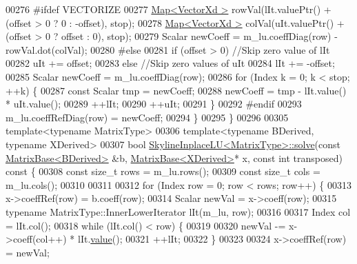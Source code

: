 \begin{DoxyCode}
00276 \textcolor{preprocessor}{#ifdef VECTORIZE}
00277         \hyperlink{group___core___module_class_eigen_1_1_map}{Map<VectorXd >} rowVal(lIt.valuePtr() + (offset > 0 ? 0 : -offset), stop);
00278         \hyperlink{group___core___module_class_eigen_1_1_map}{Map<VectorXd >} colVal(uIt.valuePtr() + (offset > 0 ? offset : 0), stop);
00279         Scalar newCoeff = m\_lu.coeffDiag(row) - rowVal.dot(colVal);
00280 \textcolor{preprocessor}{#else}
00281         \textcolor{keywordflow}{if} (offset > 0) \textcolor{comment}{//Skip zero value of lIt}
00282             uIt += offset;
00283         \textcolor{keywordflow}{else} \textcolor{comment}{//Skip zero values of uIt}
00284             lIt += -offset;
00285         Scalar newCoeff = m\_lu.coeffDiag(row);
00286         \textcolor{keywordflow}{for} (Index k = 0; k < stop; ++k) \{
00287             \textcolor{keyword}{const} Scalar tmp = newCoeff;
00288             newCoeff = tmp - lIt.value() * uIt.value();
00289             ++lIt;
00290             ++uIt;
00291         \}
00292 \textcolor{preprocessor}{#endif}
00293         m\_lu.coeffRefDiag(row) = newCoeff;
00294     \}
00295 \}
00296 
00305 \textcolor{keyword}{template}<\textcolor{keyword}{typename} MatrixType>
00306 \textcolor{keyword}{template}<\textcolor{keyword}{typename} BDerived, \textcolor{keyword}{typename} XDerived>
00307 \textcolor{keywordtype}{bool} \hyperlink{class_eigen_1_1_skyline_inplace_l_u_a53c846d76559221d2bcf336a2da4d68f}{SkylineInplaceLU<MatrixType>::solve}(\textcolor{keyword}{const} 
      \hyperlink{group___core___module_class_eigen_1_1_matrix_base}{MatrixBase<BDerived>} &b, \hyperlink{group___core___module_class_eigen_1_1_matrix_base}{MatrixBase<XDerived>}* x, \textcolor{keyword}{const} \textcolor{keywordtype}{int} 
      transposed)\textcolor{keyword}{ const }\{
00308     \textcolor{keyword}{const} \textcolor{keywordtype}{size\_t} rows = m\_lu.rows();
00309     \textcolor{keyword}{const} \textcolor{keywordtype}{size\_t} cols = m\_lu.cols();
00310 
00311 
00312     \textcolor{keywordflow}{for} (Index row = 0; row < rows; row++) \{
00313         x->coeffRef(row) = b.coeff(row);
00314         Scalar newVal = x->coeff(row);
00315         \textcolor{keyword}{typename} MatrixType::InnerLowerIterator lIt(m\_lu, row);
00316 
00317         Index col = lIt.col();
00318         \textcolor{keywordflow}{while} (lIt.col() < row) \{
00319 
00320             newVal -= x->coeff(col++) * lIt.\hyperlink{group___core___module_a8da735a6bfc7012606acf787156d10a0}{value}();
00321             ++lIt;
00322         \}
00323 
00324         x->coeffRef(row) = newVal;

\end{DoxyCode}
